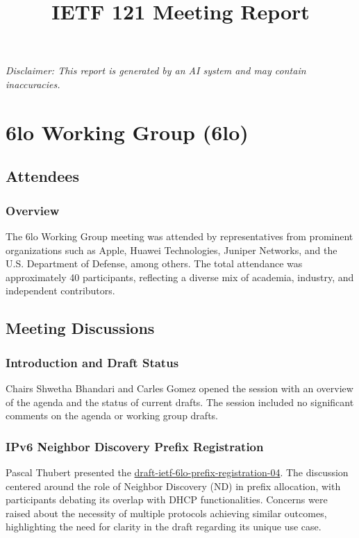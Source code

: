 \documentclass{article}
\title{\textbf{IETF 121 Meeting Report}}
\author{}
\date{}
\begin{document}
\maketitle

\noindent\textit{Disclaimer: This report is generated by an AI system and may contain inaccuracies.}


\tableofcontents
\newpage

\section{6lo Working Group (6lo)}

\subsection{Attendees}
\subsubsection{Overview}
The 6lo Working Group meeting was attended by representatives from prominent organizations such as Apple, Huawei Technologies, Juniper Networks, and the U.S. Department of Defense, among others. The total attendance was approximately 40 participants, reflecting a diverse mix of academia, industry, and independent contributors.

\subsection{Meeting Discussions}

\subsubsection{Introduction and Draft Status}
Chairs Shwetha Bhandari and Carles Gomez opened the session with an overview of the agenda and the status of current drafts. The session included no significant comments on the agenda or working group drafts.

\subsubsection{IPv6 Neighbor Discovery Prefix Registration}
Pascal Thubert presented the \href{https://datatracker.ietf.org/doc/html/draft-ietf-6lo-prefix-registration-04}{draft-ietf-6lo-prefix-registration-04}. The discussion centered around the role of Neighbor Discovery (ND) in prefix allocation, with participants debating its overlap with DHCP functionalities. Concerns were raised about the necessity of multiple protocols achieving similar outcomes, highlighting the need for clarity in the draft regarding its unique use case.
\end{document}
